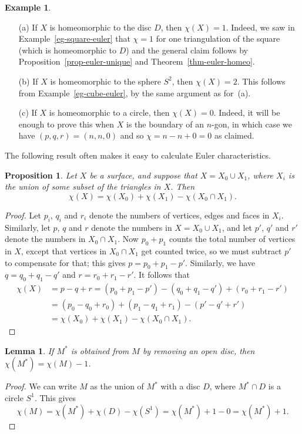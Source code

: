 \documentclass[reqno]{amsart}
\newtheorem{lemma}[theorem]{Lemma}
\newtheorem{proposition}[theorem]{Proposition}
\theoremstyle{definition}
\newtheorem{example}[theorem]{Example}
\begin{document}
\begin{example}
 \begin{itemize}
  \item[(a)] If $X$ is homeomorphic to the disc $D$, then
   $\chi(X)=1$.  Indeed, we saw in Example~\ref{eg-square-euler} that
   $\chi=1$ for one triangulation of the square (which is homeomorphic
   to $D$) and the general claim follows by
   Proposition~\ref{prop-euler-unique} and
   Theorem~\ref{thm-euler-homeo}.
  \item[(b)] If $X$ is homeomorphic to the sphere $S^2$, then
   $\chi(X)=2$.  This follows from Example~\ref{eg-cube-euler}, by the
   same argument as for~(a).
  \item[(c)] If $X$ is homeomorphic to a circle, then $\chi(X)=0$.
   Indeed, it will be enough to prove this when $X$ is the boundary of
   an $n$-gon, in which case we have $(p,q,r)=(n,n,0)$ and so
   $\chi=n-n+0=0$ as claimed.
 \end{itemize}
\end{example}

The following result often makes it easy to calculate Euler
characteristics.  
\begin{proposition}
 Let $X$ be a surface, and suppose that $X=X_0\cup X_1$, where $X_i$
 is the union of some subset of the triangles in $X$.  Then
 \[ \chi(X) = \chi(X_0)+\chi(X_1)-\chi(X_0\cap X_1). \]
\end{proposition}
\begin{proof}
 Let $p_i$, $q_i$ and $r_i$ denote the numbers of vertices, edges and
 faces in $X_i$.  Similarly, let $p$, $q$ and $r$ denote the numbers
 in $X=X_0\cup X_1$, and let $p'$, $q'$ and $r'$ denote the numbers in
 $X_0\cap X_1$.  Now $p_0+p_1$ counts the total number of vertices in
 $X$, except that vertices in $X_0\cap X_1$ get counted twice, so we
 must subtract $p'$ to compensate for that; this gives
 $p=p_0+p_1-p'$.  Similarly, we have $q=q_0+q_1-q'$ and
 $r=r_0+r_1-r'$.  It follows that 
 \begin{align*}
  \chi(X) &= p-q+r
           = (p_0+p_1-p') - (q_0+q_1-q') + (r_0+r_1-r') \\
          &= (p_0-q_0+r_0) + (p_1-q_1+r_1) - (p'-q'+r') \\
          &= \chi(X_0) + \chi(X_1) - \chi(X_0\cap X_1).
 \end{align*}
\end{proof}

\begin{lemma}
 If $M^*$ is obtained from $M$ by removing an open disc, then
 $\chi(M^*)=\chi(M)-1$.  
\end{lemma}
\begin{proof}
 We can write $M$ as the union of $M^*$ with a disc $D$, where
 $M^*\cap D$ is a circle $S^1$.  This gives
 \[ \chi(M) = \chi(M^*) + \chi(D) - \chi(S^1) =
      \chi(M^*) + 1 - 0 = \chi(M^*) + 1.
 \]
\end{proof}
\end{document}
